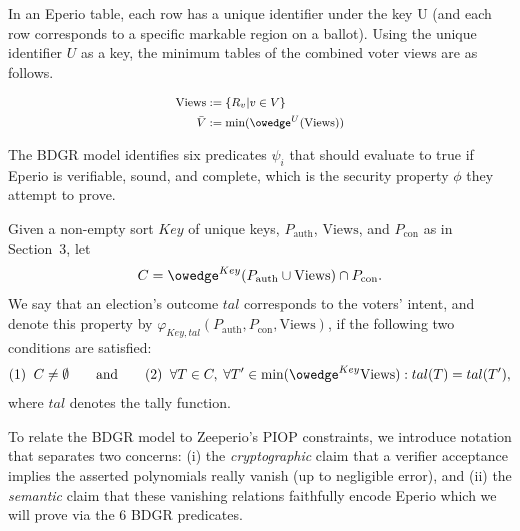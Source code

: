 In an Eperio table, each row has a unique identifier under the key U (and each row corresponds to a specific markable region on a ballot). Using the unique identifier $U$ as a key, the minimum tables of the combined voter views are as follows.

\begin{mdframed}[linewidth=0.6pt,backgroundcolor=verylightblue,innerleftmargin=6pt,innerrightmargin=6pt,innertopmargin=4pt,innerbottommargin=4pt]
\[
\footnotesize
\begin{aligned}
\mathrm{Views}&:=\{R_v|v\in V\}\\
\bar{V}&:=\min(\owedge^{U}(\mathrm{Views}))\\
\end{aligned}
\]
\end{mdframed}


The BDGR model identifies six predicates $\psi_i$ that should evaluate to true if Eperio is verifiable, sound, and complete, which is the security property $\phi$ they attempt to prove.

\begin{mdframed}[linewidth=0.6pt,backgroundcolor=verylightblue,innerleftmargin=6pt,innerrightmargin=6pt,innertopmargin=4pt,innerbottommargin=4pt,nobreak=true]
\begin{definition}
\label{def:bdgr}
Given a non-empty sort $Key$ of unique keys, $P_{\mathrm{auth}}$, $\mathrm{Views}$, and $P_{\mathrm{con}}$ as in Section~3, let
\[
C = \owedge^{Key}(P_{\mathrm{auth}}\cup \mathrm{Views}) \cap P_{\mathrm{con}}.
\]
We say that an election’s outcome $tal$ corresponds to the voters’ intent, and denote this property by
$\varphi_{Key,tal}(P_{\mathrm{auth}},P_{\mathrm{con}},\mathrm{Views})$, if the following two conditions are satisfied:
\[
(1)\;\; C \neq \emptyset
\qquad\text{and}\qquad
(2)\;\; \forall T \in C,\; \forall T' \in \min(\owedge^{Key}\mathrm{Views}) : tal(T) = tal(T'),
\]
where $tal$ denotes the tally function.
\end{definition}
\end{mdframed}

To relate the BDGR model to Zeeperio's PIOP constraints, we introduce notation that separates two concerns:
(i) the \emph{cryptographic} claim that a verifier acceptance implies the asserted polynomials really vanish (up to negligible error), and
(ii) the \emph{semantic} claim that these vanishing relations faithfully encode Eperio which we will prove via the 6 BDGR predicates.

